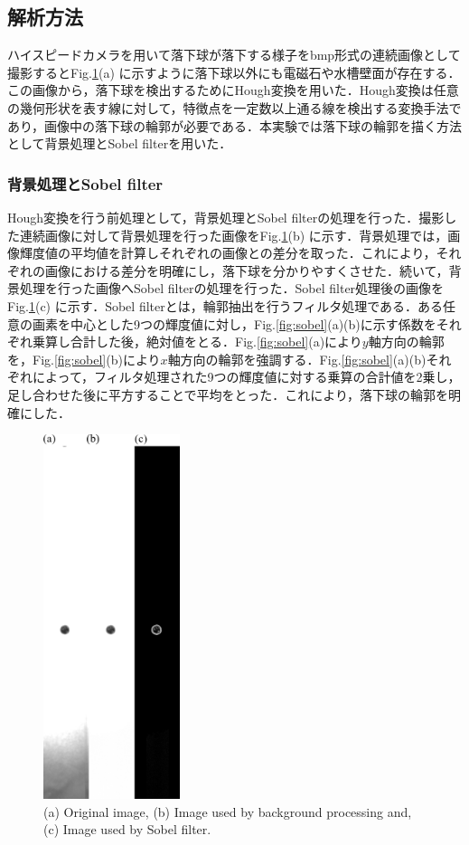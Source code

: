 \subsection{解析方法}
ハイスピードカメラを用いて落下球が落下する様子をbmp形式の連続画像として撮影するとFig.\ref{fig:expPhoto}(a) に示すように落下球以外にも電磁石や水槽壁面が存在する．この画像から，落下球を検出するためにHough変換を用いた．Hough変換は任意の幾何形状を表す線に対して，特徴点を一定数以上通る線を検出する変換手法であり，画像中の落下球の輪郭が必要である．本実験では落下球の輪郭を描く方法として背景処理とSobel filterを用いた．
\subsubsection{背景処理とSobel filter}
Hough変換を行う前処理として，背景処理とSobel filterの処理を行った．撮影した連続画像に対して背景処理を行った画像をFig.\ref{fig:expPhoto}(b) に示す．背景処理では，画像輝度値の平均値を計算しそれぞれの画像との差分を取った．これにより，それぞれの画像における差分を明確にし，落下球を分かりやすくさせた．続いて，背景処理を行った画像へSobel filterの処理を行った．Sobel filter処理後の画像をFig.\ref{fig:expPhoto}(c) に示す．Sobel filterとは，輪郭抽出を行うフィルタ処理である．ある任意の画素を中心とした9つの輝度値に対し，Fig.\ref{fig:sobel}(a)(b)に示す係数をそれぞれ乗算し合計した後，絶対値をとる．Fig.\ref{fig:sobel}(a)により$y$軸方向の輪郭を，Fig.\ref{fig:sobel}(b)により$x$軸方向の輪郭を強調する．Fig.\ref{fig:sobel}(a)(b)それぞれによって，フィルタ処理された9つの輝度値に対する乗算の合計値を2乗し，足し合わせた後に平方することで平均をとった．これにより，落下球の輪郭を明確にした．

\begin{figure}[h]
    \centering
    \includegraphics[width=4.0cm,clip]{2-Methods/exp-img.png}
    \caption{(a) Original image, (b) Image used by background processing and, (c) Image used by Sobel filter.}
    \label{fig:expPhoto}
\end{figure}

